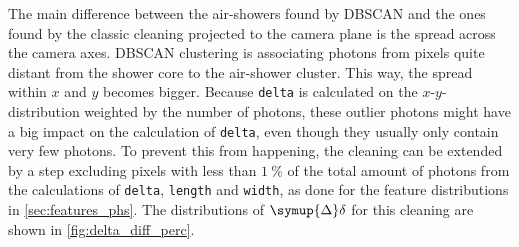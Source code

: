 The main difference between the air-showers found by DBSCAN
and the ones found by the classic cleaning projected to the camera plane is
the spread across the camera axes. DBSCAN clustering is associating photons
from pixels quite distant from the shower core to the air-shower cluster.
This way, the spread within $x$ and $y$ becomes bigger. Because
\texttt{delta} is calculated on the $x$-$y$-distribution weighted by the
number of photons, these outlier photons might have a big impact on the
calculation of \texttt{delta}, even though they usually only contain very
few photons. To prevent this from happening, the cleaning can be extended by
a step excluding pixels with less than $\SI{1}{\percent}$ of the total
amount of photons from the calculations of \texttt{delta}, \texttt{length}
and \texttt{width}, as done for the feature distributions in \autoref{sec:features_phs}. The distributions of $\symup{\Delta}\delta$ for this
cleaning are shown in \autoref{fig:delta_diff_perc}.

